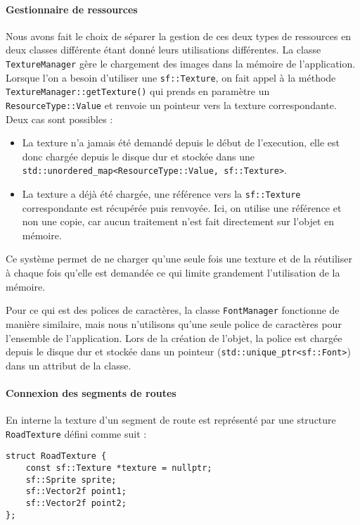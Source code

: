 \paragraph{Gestionnaire de ressources}
Nous avons fait le choix de séparer la gestion de ces deux types de ressources en deux classes différente étant donné leurs utilisations différentes.
La classe \texttt{TextureManager} gère le chargement des images dans la mémoire de l'application.
Lorsque l'on a besoin d'utiliser une \texttt{sf::Texture}, on fait appel à la méthode \texttt{TextureManager::getTexture()} qui prends en paramètre un \texttt{ResourceType::Value} et renvoie un pointeur vers la texture correspondante.
Deux cas sont possibles :
\begin{itemize}
    \item La texture n'a jamais été demandé depuis le début de l'execution, elle est donc chargée depuis le disque dur et stockée dans une \texttt{std::unordered\_map<ResourceType::Value, sf::Texture>}.
    \item La texture a déjà été chargée, une référence vers la \texttt{sf::Texture} correspondante est récupérée puis renvoyée.
    Ici, on utilise une référence et non une copie, car aucun traitement n'est fait directement sur l'objet en mémoire.
\end{itemize}
Ce système permet de ne charger qu'une seule fois une texture et de la réutiliser à chaque fois qu'elle est demandée ce qui limite grandement l'utilisation de la mémoire.

Pour ce qui est des polices de caractères, la classe \texttt{FontManager} fonctionne de manière similaire, mais nous n'utilisons qu'une seule police de caractères pour l'ensemble de l'application.
Lors de la création de l'objet, la police est chargée depuis le disque dur et stockée dans un pointeur (\texttt{std::unique\_ptr<sf::Font>}) dans un attribut de la classe.


\paragraph{Connexion des segments de routes}
En interne la texture d'un segment de route est représenté par une structure \texttt{RoadTexture} défini comme suit :

\begin{lstlisting}[style=CStyle,label={lst:struct_roadtexture}]
struct RoadTexture {
    const sf::Texture *texture = nullptr;
    sf::Sprite sprite;
    sf::Vector2f point1;
    sf::Vector2f point2;
};
\end{lstlisting}


